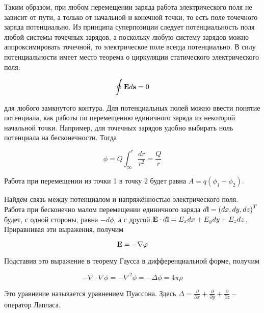 \noindent
Таким образом, при любом перемещении заряда работа электрического поля не зависит от пути, а только от начальной и конечной точки, то есть поле точечного заряда потенциально. Из принципа суперпозиции следует потенциальность поля любой системы точечных зарядов, а поскольку любую систему зарядов можно аппроксимировать точечной, то электрическое поле всегда потенциально. В силу потенциальности имеет место теорема о циркуляции статического электрического поля:

\begin{equation}
    \oint \mathbf E d \mathbf s = 0
\end{equation}

\noindent
для любого замкнутого контура. Для потенциальных полей можно ввести понятие потенциала, как работы по перемещению единичного заряда из некоторой начальной точки. Например, для точечных зарядов удобно выбирать ноль потенциала на бесконечности. Тогда

\begin{equation}
    \phi = Q \int_{\infty}^r \frac{dr}{r^2} = \frac{Q}{r}
\end{equation}

\noindent
Работа при перемещении из точки 1 в точку 2 будет равна $A = q \left( \phi_1 - \phi_2 \right)$.

Найдём связь между потенциалом и напряжённостью электрического поля. Работа при бесконечно малом перемещении единичного заряда $d \mathbf l = \left( dx, dy, dz \right)^T$ будет, с одной стороны, равна $- d \phi$, а с другой $\mathbf E \cdot d \mathbf l = E_x dx + E_y dy + E_z dz$. Приравнивая эти выражения, получим

\begin{equation}
    \mathbf E = - \nabla \varphi
\end{equation}

\noindent
Подставив это выражение в теорему Гаусса в дифференциальной форме, получим

\begin{equation}
    - \nabla \cdot \nabla \phi = - \nabla^2 \phi = - \Delta \phi = 4 \pi \rho
\end{equation}

\noindent
Это уравнение называется уравнением Пуассона. Здесь $\Delta = \frac{\partial}{\partial x} + \frac{\partial}{\partial y} + \frac{\partial}{\partial z}$ -- оператор Лапласа.
